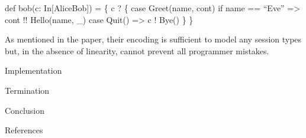 \documentclass[ignorenonframetext,]{beamer}
\newif\ifbibliography
\begin{document}
\begin{frame}

def bob(c: In{[}AliceBob{]}) = \{ c ? \{ case Greet(name, cont) if name
== “Eve” =\textgreater{} cont !! Hello(name, \_) case Quit()
=\textgreater{} c ! Bye() \} \}

As mentioned in the paper, their encoding is sufficient to model any
session types but, in the absence of linearity, cannot prevent all
programmer mistakes.

\end{frame}

\begin{frame}{%
\protect\hypertarget{implementation-3}{%
Implementation}}

\end{frame}

\begin{frame}{%
\protect\hypertarget{termination-1}{%
Termination}}

\end{frame}

\begin{frame}{%
\protect\hypertarget{conclusion-2}{%
Conclusion}}

\end{frame}

\begin{frame}[allowframebreaks]{References}
\bibliographytrue
\printbibliography[heading=none]
\end{frame}
\end{document}
